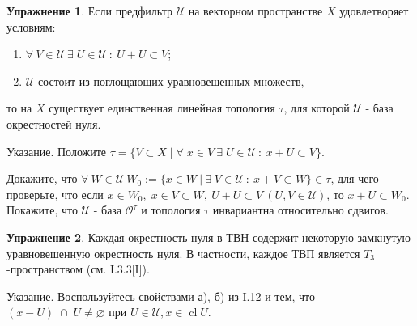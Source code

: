 \documentclass[a4paper, 12pt]{article}
\theoremstyle{definition}
\newtheorem{problem}{Упражнение}[section]
\theoremstyle{remark}
\DeclareMathOperator{\clo}{cl}
\begin{document}
\begin{problem}
    Если предфильтр $\mathcal U$ на векторном пространстве $X$ удовлетворяет условиям:
    \begin{enumerate}
        \item $\forall \ V\in \mathcal U \ \exists \; U \in \mathcal U \ : \ U + U \subset V$;
        \item $\mathcal U$ состоит из поглощающих уравновешенных множеств,
    \end{enumerate}
    то на $X$ существует единственная линейная топология $\tau$, для которой $\mathcal U$ - база окрестностей нуля.

    Указание. Положите $\tau = \{V \subset X \; |\; \forall \; x\in V \ \exists \; U \in \mathcal U \ : \ x + U \subset V\}$.

    Докажите, что $\forall \ W \in \mathcal U \ W_0 := \{x\in W \ | \ \exists \; V \in \mathcal U \ : \ x + V \subset W\} \in \tau$, для чего проверьте, что если $x\in W_0,\; x\in V \subset W, \ U + U \subset V \ (U, V \in \mathcal U)$, то $x + U \subset W_0$. Покажите, что $\mathcal U$ - база $\mathcal O^\tau$ и топология $\tau$ инвариантна относительно сдвигов.
\end{problem}
\begin{problem}
    Каждая окрестность нуля в ТВН содержит некоторую замкнутую уравновешенную окрестность нуля. В частности, каждое ТВП является $T_3$-пространством (см. I.3.3[I]).

    Указание. Воспользуйтесь свойствами а), б) из I.12 и тем, что $(x-U)\;\cap \; U \neq \varnothing$ при $U\in \mathcal U, x\in \clo U$.
\end{problem}
\end{document}
